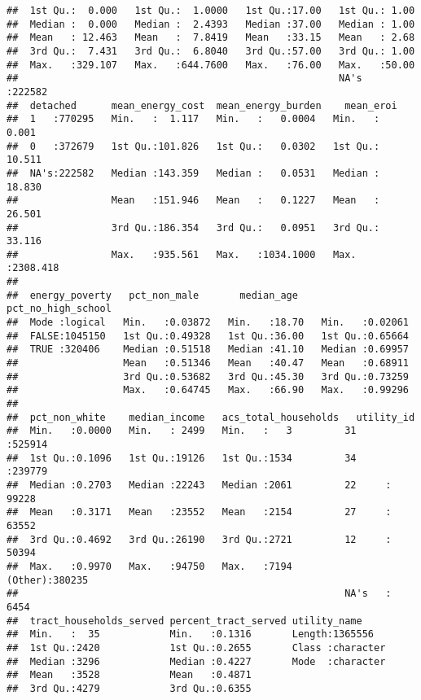 \documentclass[]{article}
\begin{document}
\begin{verbatim}
##  1st Qu.:  0.000   1st Qu.:  1.0000   1st Qu.:17.00   1st Qu.: 1.00   
##  Median :  0.000   Median :  2.4393   Median :37.00   Median : 1.00   
##  Mean   : 12.463   Mean   :  7.8419   Mean   :33.15   Mean   : 2.68   
##  3rd Qu.:  7.431   3rd Qu.:  6.8040   3rd Qu.:57.00   3rd Qu.: 1.00   
##  Max.   :329.107   Max.   :644.7600   Max.   :76.00   Max.   :50.00   
##                                                       NA's   :222582  
##  detached      mean_energy_cost  mean_energy_burden    mean_eroi       
##  1   :770295   Min.   :  1.117   Min.   :   0.0004   Min.   :   0.001  
##  0   :372679   1st Qu.:101.826   1st Qu.:   0.0302   1st Qu.:  10.511  
##  NA's:222582   Median :143.359   Median :   0.0531   Median :  18.830  
##                Mean   :151.946   Mean   :   0.1227   Mean   :  26.501  
##                3rd Qu.:186.354   3rd Qu.:   0.0951   3rd Qu.:  33.116  
##                Max.   :935.561   Max.   :1034.1000   Max.   :2308.418  
##                                                                        
##  energy_poverty   pct_non_male       median_age    pct_no_high_school
##  Mode :logical   Min.   :0.03872   Min.   :18.70   Min.   :0.02061   
##  FALSE:1045150   1st Qu.:0.49328   1st Qu.:36.00   1st Qu.:0.65664   
##  TRUE :320406    Median :0.51518   Median :41.10   Median :0.69957   
##                  Mean   :0.51346   Mean   :40.47   Mean   :0.68911   
##                  3rd Qu.:0.53682   3rd Qu.:45.30   3rd Qu.:0.73259   
##                  Max.   :0.64745   Max.   :66.90   Max.   :0.99296   
##                                                                      
##  pct_non_white    median_income   acs_total_households   utility_id    
##  Min.   :0.0000   Min.   : 2499   Min.   :   3         31     :525914  
##  1st Qu.:0.1096   1st Qu.:19126   1st Qu.:1534         34     :239779  
##  Median :0.2703   Median :22243   Median :2061         22     : 99228  
##  Mean   :0.3171   Mean   :23552   Mean   :2154         27     : 63552  
##  3rd Qu.:0.4692   3rd Qu.:26190   3rd Qu.:2721         12     : 50394  
##  Max.   :0.9970   Max.   :94750   Max.   :7194         (Other):380235  
##                                                        NA's   :  6454  
##  tract_households_served percent_tract_served utility_name      
##  Min.   :  35            Min.   :0.1316       Length:1365556    
##  1st Qu.:2420            1st Qu.:0.2655       Class :character  
##  Median :3296            Median :0.4227       Mode  :character  
##  Mean   :3528            Mean   :0.4871                         
##  3rd Qu.:4279            3rd Qu.:0.6355                         

\end{verbatim}
\end{document}
